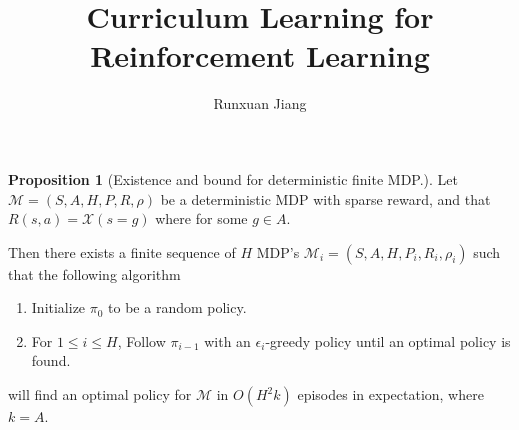 \documentclass[12pt, letterpaper]{article}
\title{Curriculum Learning for Reinforcement Learning}
\author{Runxuan Jiang}
\date{}
\theoremstyle{definition}
\newtheorem*{prop}{Proposition}
\theoremstyle{remark}
\begin{document}
\maketitle

\begin{prop}[Existence and bound for deterministic finite MDP.]
    Let \(\mathcal{M} = (S, A, H, P, R, \rho)\) be a deterministic MDP with sparse reward, and that \(R(s, a) = \mathcal{X}(s = g)\) where for some \(g \in A\).
    
    Then there exists a finite sequence of $H$ MDP's \(\mathcal{M}_i = (S, A, H, P_i, R_i, \rho_i)\) such that the following algorithm

    \begin{enumerate}
        \item Initialize \(\pi_0\) to be a random policy.
        \item For \(1 \leq i \leq H\), Follow \(\pi_{i-1}\) with an \(\epsilon_i\)-greedy policy until an optimal policy is found.
    \end{enumerate}

    will find an optimal policy for \(\mathcal{M}\) in \(O(H^2k)\) episodes in expectation, where \(k = A\).
    
\end{prop}
\end{document}

